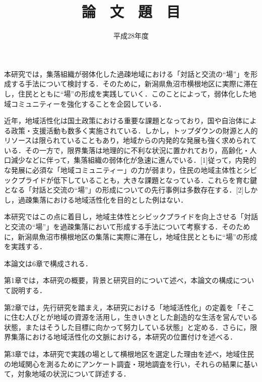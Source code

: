 \documentclass[a4paper]{jsarticle}
\begin{document}
 \masterthesis


\title{論　文　題　目}
\date{平成28年度}
\maketitle


\setcounter{page}{1} %
\par
本研究では，集落組織が弱体化した過疎地域における「対話と交流の“場”」を形成する手法について検討する．そのために，新潟県魚沼市横根地区に実際に滞在し，住民とともに“場”の形成を実践していく．このことによって，弱体化した地域コミュニティーを強化することを企図している．\par
近年，地域活性化は国土政策における重要な課題となっており，国や自治体による政策・支援活動も数多く実施されている．しかし，トップダウンの財源と人的リソースは限られていることもあり，地域からの内発的な発展も強く求められている．その一方で，限界集落は地理的に不利な状況に置かれており，高齢化・人口減少などに伴って，集落組織の弱体化が急速に進んでいる．[1]従って，内発的な発展に必須な「地域コミュニティー」の力が弱まり，住民の地域主体性とシビックプライドが低下していることも，大きな課題となっている．これらを育む鍵となる「対話と交流の“場”」の形成についての先行事例は多数存在する．[2]しかし，過疎集落における地域活性化を目的とした例はない．\par
本研究ではこの点に着目し，地域主体性とシビックプライドを向上させる「対話と交流の“場”」を過疎集落において形成する手法について考察する．そのために，新潟県魚沼市横根地区の集落に実際に滞在し，地域住民とともに“場”の形成を実践する．\par
本論文は6章で構成される．\par
第1章では，本研究の概要，背景と研究目的について述べ，本論文の構成について説明する．\par
第2章では，先行研究を踏まえ，本研究における「地域活性化」の定義を「そこに住む人びとが地域の資源を活用し，生きいきとした創造的な生活を営んでいる状態，またはそうした目標に向かって努力している状態」と定める．さらに，限界集落における地域活性化の文脈における，本研究の位置付けを述べる．\par
第3章では，本研究で実践の場として横根地区を選定した理由を述べ，地域住民の地域関心を測るためにアンケート調査・現地調査を行い，それらの結果に基いて，対象地域の状況について詳述する．\par
\end{document}
